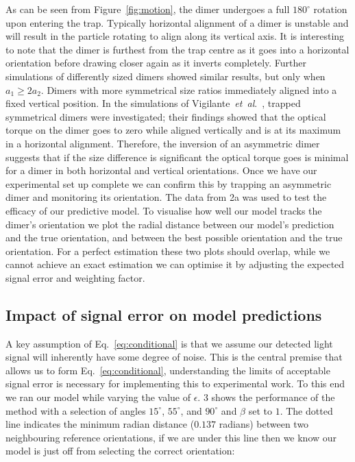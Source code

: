 \documentclass[final, 3p]{elsarticle}
\begin{document}
As can be seen from Figure~\ref{fig:motion}, the dimer undergoes a
full $180^{\circ}$ rotation upon entering the trap.  Typically
horizontal alignment of a dimer is unstable and will result in the
particle rotating to align along its vertical axis.  It is interesting
to note that the dimer is furthest from the trap centre as it goes
into a horizontal orientation before drawing closer again as it
inverts completely. Further simulations of differently sized dimers
showed similar results, but only when $a_1 \geq 2a_2$.  Dimers with
more symmetrical size ratios immediately aligned into a fixed vertical
position.
%
In the simulations of Vigilante~\emph{et~al}.\
\cite{Vigilante2020Brownian_OT}, trapped symmetrical dimers were
investigated; their findings showed that the optical torque on the
dimer goes to zero while aligned vertically and is at its maximum in a
horizontal alignment.  Therefore, the inversion of an asymmetric dimer
suggests that if the size difference is significant the optical torque
goes is minimal for a dimer in both horizontal and vertical
orientations. Once we have our experimental set up complete we can
confirm this by trapping an asymmetric dimer and monitoring its
orientation.  The data from \figurename{ 2a} was used to test the
efficacy of our predictive model.  To visualise how well our model
tracks the dimer's orientation we plot the radial distance between our
model's prediction and the true orientation, and between the best
possible orientation and the true orientation.  For a perfect
estimation these two plots should overlap, while we cannot achieve an
exact estimation we can optimise it by adjusting the expected signal
error and weighting factor.


\subsection{Impact of signal error on model predictions}
\label{sec:epsilon}

A key assumption of Eq.~\eqref{eq:conditional} is that we assume our
detected light signal will inherently have some degree of noise. This
is the central premise that allows us to form
Eq.~\eqref{eq:conditional}, understanding the limits of acceptable
signal error is necessary for implementing this to experimental work.
To this end we ran our model while varying the value of $\epsilon$.
\figurename{ 3} shows the performance of the method with a selection
of angles $15^{\circ}$, $55^{\circ}$, and $90^{\circ}$ and $\beta$ set
to $1$.  The dotted line indicates the minimum radian distance
($0.137$ radians) between two neighbouring reference orientations, if
we are under this line then we know our model is just off from
selecting the correct orientation:
\end{document}

